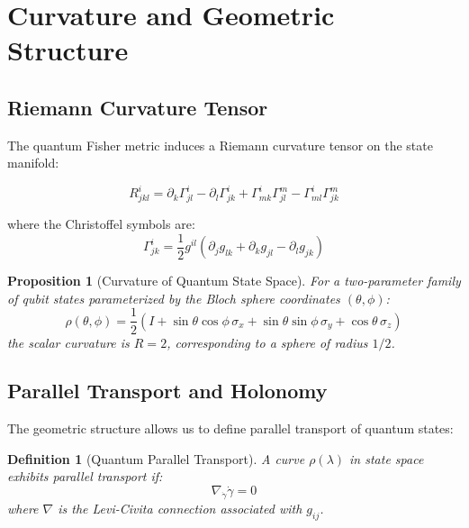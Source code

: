 \documentclass[12pt,a4paper]{article}
\newtheorem{definition}{Definition}
\newtheorem{proposition}{Proposition}
\begin{document}
\section{Curvature and Geometric Structure}

\subsection{Riemann Curvature Tensor}

The quantum Fisher metric induces a Riemann curvature tensor on the state manifold:

\begin{equation}
R^i_{jkl} = \partial_k \Gamma^i_{jl} - \partial_l \Gamma^i_{jk} + \Gamma^i_{mk}\Gamma^m_{jl} - \Gamma^i_{ml}\Gamma^m_{jk}
\end{equation}

where the Christoffel symbols are:
\begin{equation}
\Gamma^i_{jk} = \frac{1}{2}g^{il}(\partial_j g_{lk} + \partial_k g_{jl} - \partial_l g_{jk})
\end{equation}

\begin{proposition}[Curvature of Quantum State Space]
For a two-parameter family of qubit states parameterized by the Bloch sphere coordinates $(\theta, \phi)$:
\begin{equation}
\rho(\theta, \phi) = \frac{1}{2}(I + \sin\theta\cos\phi\, \sigma_x + \sin\theta\sin\phi\, \sigma_y + \cos\theta\, \sigma_z)
\end{equation}
the scalar curvature is $R = 2$, corresponding to a sphere of radius $1/2$.
\end{proposition}

\subsection{Parallel Transport and Holonomy}

The geometric structure allows us to define parallel transport of quantum states:

\begin{definition}[Quantum Parallel Transport]
A curve $\rho(\lambda)$ in state space exhibits parallel transport if:
\begin{equation}
\nabla_{\dot{\gamma}} \dot{\gamma} = 0
\end{equation}
where $\nabla$ is the Levi-Civita connection associated with $g_{ij}$.
\end{definition}
\end{document}
